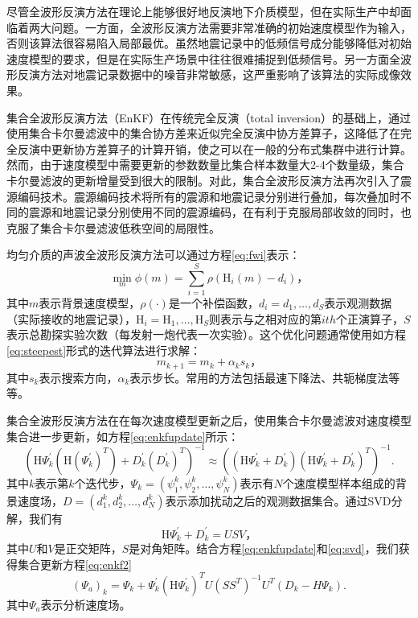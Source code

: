 \documentclass[degree=doctor]{thuthesis}
\begin{document}
尽管全波形反演方法在理论上能够很好地反演地下介质模型，但在实际生产中却面临着两大问题。一方面，全波形反演方法需要非常准确的初始速度模型作为输入，否则该算法很容易陷入局部最优\cite{virieux2009overview}。虽然地震记录中的低频信号成分能够降低对初始速度模型的要求，但是在实际生产场景中往往很难捕捉到低频信号\cite{sirgue2006importance}。另一方面全波形反演方法对地震记录数据中的噪音非常敏感，这严重影响了该算法的实际成像效果。

集合全波形反演方法（EnKF）\cite{yushu,he2015ensemble}在传统完全反演\cite{tarantola1982generalized}（total inversion）的基础上，通过使用集合卡尔曼滤波\cite{evensen2003ensemble}中的集合协方差来近似完全反演中协方差算子，这降低了在完全反演中更新协方差算子的计算开销，使之可以在一般的分布式集群中进行计算。然而，由于速度模型中需要更新的参数数量比集合样本数量大2-4个数量级，集合卡尔曼滤波的更新增量受到很大的限制。对此，集合全波形反演方法再次引入了震源编码技术\cite{krebs2009fast}。震源编码技术将所有的震源和地震记录分别进行叠加，每次叠加时不同的震源和地震记录分别使用不同的震源编码，在有利于克服局部收敛的同时\cite{castellanos2014fast}，也克服了集合卡尔曼滤波低秩空间的局限性。

均匀介质的声波全波形反演方法可以通过方程\ref{eq:fwi}表示：
\begin{equation}
\label{eq:fwi}
  \min_{m} \phi(m) = \sum_{i=1}^S \rho(\mbox{H}_i(m) - d_{i} )，
\end{equation}
其中$m$表示背景速度模型，$\rho(\cdot)$是一个补偿函数，$d_i=d_1, \ldots, d_S$表示观测数据（实际接收的地震记录），$\mbox{H}_i=\mbox{H}_1, \ldots, \mbox{H}_S$则表示与之相对应的第$i{th}$个正演算子，$S$表示总勘探实验次数（每发射一炮代表一次实验）。这个优化问题通常使用如方程\ref{eq:steepest}形式的迭代算法进行求解：
\begin{equation}
\label{eq:steepest}
m_{k+1} = m_{k} + \alpha_{k}s_k，
\end{equation}
其中$s_k$表示搜索方向，$\alpha_{k}$表示步长。常用的方法包括最速下降法、共轭梯度法等等。

集合全波形反演方法在在每次速度模型更新之后，使用集合卡尔曼滤波对速度模型集合进一步更新，如方程\ref{eq:enkfupdate}所示：
\begin{equation}
\label{eq:enkfupdate}
\left(\mbox{H}\Psi_k^{'}(\mbox{H}(\Psi_k^{'})^T)+D_k^{'}(D_k^{'})^T\right)^{-1}\approx\left((\mbox{H}\Psi_k^{'}+D_k^{'})(\mbox{H}\Psi_k^{'}+D_k^{'})^T\right)^{-1}.
\end{equation}
其中$k$表示第$k$个迭代步，$\Psi_k=(\psi_1^k,\psi_2^k,\ldots,\psi_N^k)$表示有$N$个速度模型样本组成的背景速度场，$D=(d_1^k,d_2^k,\ldots,d_N^k)$表示添加扰动之后的观测数据集合。通过SVD分解，我们有
\begin{equation}
\label{eq:svd}
\mbox{H}\Psi_k^{'}+D_k^{'}=USV，
\end{equation}
其中$U$和$V$是正交矩阵，$S$是对角矩阵。结合方程\ref{eq:enkfupdate}和\ref{eq:svd}，我们获得集合更新方程\ref{eq:enkf2}
\begin{equation}
\label{eq:enkf2}
(\Psi_a)_k=\Psi_k+\Psi_k^{'}(\mbox{H}\Psi_k^{'})^TU(SS^T)^{-1}U^T(D_k-H\Psi_k).
\end{equation}
其中$\Psi_a$表示分析速度场。
\end{document}
